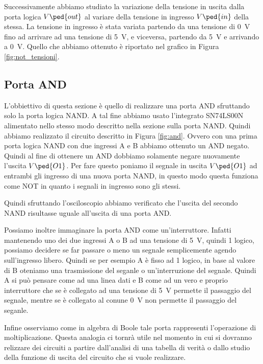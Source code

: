 Successivamente abbiamo studiato la variazione della tensione in uscita dalla porta logica $V\ped{out}$ al variare della tensione in ingresso $V\ped{in}$ della stessa. La tensione in ingresso è stata variata partendo da una tensione di \SI{0}{\volt} fino ad arrivare ad una tensione di \SI{+5}{\volt}, e viceversa, partendo da \SI{+5}{\volt} e arrivando a \SI{0}{\volt}. Quello che abbiamo ottenuto è riportato nel grafico in Figura \ref{fig:not_tensioni}.

\subsection*{Porta AND}

L'obbiettivo di questa sezione è quello di realizzare una porta AND sfruttando solo la porta logica NAND. A tal fine abbiamo usato l'integrato SN74LS00N alimentato nello stesso modo descritto nella sezione sulla porta NAND.
Quindi abbiamo realizzato il circuito descritto in Figura \ref{fig:and}. Ovvero con una prima porta logica NAND con due ingressi A e B abbiamo ottenuto un AND negato. Quindi al fine di ottenere un AND dobbiamo solamente negare nuovamente l'uscita $V\ped{O1}$. Per fare questo poniamo il segnale in uscita $V\ped{O1}$ ad entrambi gli ingresso di una nuova porta NAND, in questo modo questa funziona come NOT in quanto i segnali in ingresso sono gli stessi.

Quindi sfruttando l'osciloscopio abbiamo verificato che l'uscita del secondo NAND risultasse uguale all'uscita di una porta AND.

Possiamo inoltre immaginare la porta AND come un'interruttore. Infatti mantenendo uno dei due ingressi A o B ad una tensione di \SI{+5}{\volt}, quindi 1 logico, possiamo decidere se far passare o meno un segnale semplicemente agendo sull'ingresso libero.
Quindi se per esempio A è fisso ad 1 logico, in base al valore di B oteniamo una trasmissione del seganle o un'interruzione del segnale. Quindi A si può pensare come ad una linea dati e B come ad un vero e proprio interruttore che se è collegato ad una tensione di \SI{+5}{\volt} permette il passaggio del segnale, mentre se è collegato al conune \SI{0}{\volt} non permette il passaggio del seganle.

Infine osserviamo come in algebra di Boole tale porta rappresenti l'operazione di moltiplicazione. Questa analogia ci tornrà utile nel momento in cui si dovranno relizzare dei circuiti a partire dall'analisi di una tabella di verità o dallo studio della funzione di uscita del circuito che si vuole realizzare.

